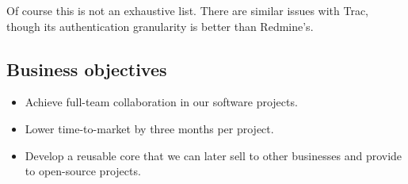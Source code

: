 Of course this is not an exhaustive list. There are similar issues with Trac, though its authentication granularity is better than Redmine’s.


\subsection{Business objectives}
\subsectionrule

\begin{itemize}
\item{Achieve full-team collaboration in our software projects.}
\item{Lower time-to-market by three months per project.}
\item{Develop a reusable core that we can later sell to other businesses and provide to open-source projects.}
\end{itemize}
